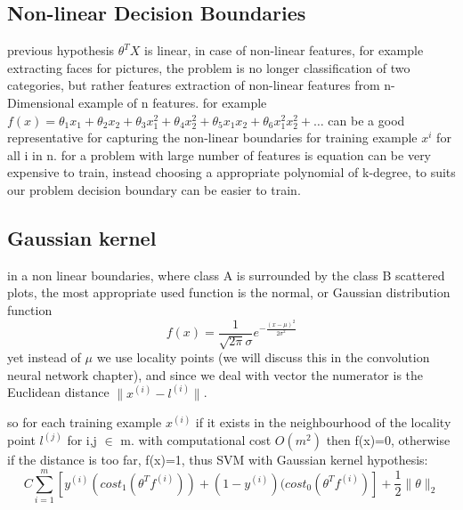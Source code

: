 \documentclass[4apaper,12pt]{book}
\begin{document}
\begin{description}
    \subsection{Non-linear Decision Boundaries}
    \begin{description}
    \item previous hypothesis $\theta^TX$ is linear, in case of non-linear features, for example extracting faces for pictures, the problem is no longer classification of two categories, but rather features extraction of non-linear features from n-Dimensional example of n features. for example $ f(x) = \theta_1x_1 + \theta_2x_2+ \theta_3x_1^2 + \theta_4x_2^2 + \theta_5x_1x_2 + \theta_6x_1^2x_2^2 + \dots $ can be a good representative for capturing the non-linear boundaries for training example $x^i$ for all i in n. for a problem with large number of features is equation can be very expensive to train, instead choosing a appropriate polynomial of k-degree, to suits our problem decision boundary can be easier to train.
      \subsection{Gaussian kernel}
      \begin{description}
      \item in a non linear boundaries, where class A is surrounded by the class B scattered plots, the most appropriate used function is the normal, or Gaussian distribution function $$f(x)=\frac{1}{\sqrt{2\pi}\sigma}e^{-\frac{(x-\mu)^2}{2\sigma^2}}$$ yet instead of $\mu$ we use locality points (we will discuss this in the convolution neural network chapter), and since we deal with vector the numerator is the Euclidean distance $\lVert x^{(i)} - l^{(i)} \rVert$.
      \item so for each training example $x^{(i)}$ if it exists in the neighbourhood of the locality point $l^{(j)}$ for i,j $\in$ m. with computational cost $O(m^2)$ then f(x)=0, otherwise if the distance is too far, f(x)=1, thus SVM with Gaussian kernel hypothesis: $$C\sum_{i=1}^m[y^{(i)}(cost_1(\theta^Tf^{(i)})) + (1-y^{(i)}) (cost_0(\theta^Tf^{(i)})] + \frac{1}{2} \lVert \theta \rVert_2$$
      \end{description}
    \end{description}
  \end{description}
\end{document}
